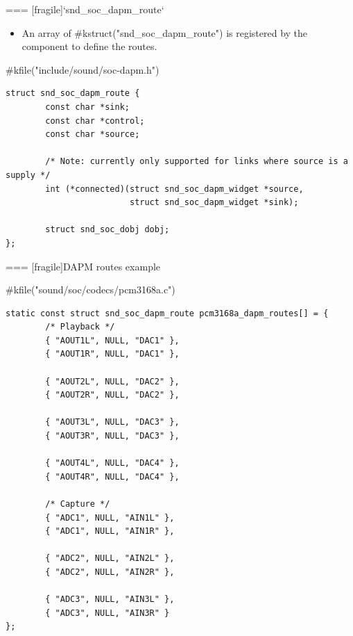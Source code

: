 === [fragile]{`snd_soc_dapm_route`}
  \begin{itemize}
  \item An array of #kstruct("snd_soc_dapm_route") is registered
    by the component to define the routes.
  \end{itemize}
  \begin{block}{#kfile("include/sound/soc-dapm.h")}
    \fontsize{9}{9}\selectfont
    \begin{verbatim}
struct snd_soc_dapm_route {
        const char *sink;
        const char *control;
        const char *source;

        /* Note: currently only supported for links where source is a supply */
        int (*connected)(struct snd_soc_dapm_widget *source,
                         struct snd_soc_dapm_widget *sink);

        struct snd_soc_dobj dobj;
};
    \end{verbatim}
  \end{block}


=== [fragile]{DAPM routes example}
  \begin{block}{#kfile("sound/soc/codecs/pcm3168a.c")}
    \fontsize{8}{7}\selectfont
    \begin{verbatim}
static const struct snd_soc_dapm_route pcm3168a_dapm_routes[] = {
        /* Playback */
        { "AOUT1L", NULL, "DAC1" },
        { "AOUT1R", NULL, "DAC1" },

        { "AOUT2L", NULL, "DAC2" },
        { "AOUT2R", NULL, "DAC2" },

        { "AOUT3L", NULL, "DAC3" },
        { "AOUT3R", NULL, "DAC3" },

        { "AOUT4L", NULL, "DAC4" },
        { "AOUT4R", NULL, "DAC4" },

        /* Capture */
        { "ADC1", NULL, "AIN1L" },
        { "ADC1", NULL, "AIN1R" },

        { "ADC2", NULL, "AIN2L" },
        { "ADC2", NULL, "AIN2R" },

        { "ADC3", NULL, "AIN3L" },
        { "ADC3", NULL, "AIN3R" }
};
    \end{verbatim}
  \end{block}



